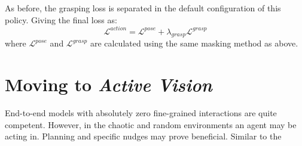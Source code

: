 As before, the grasping loss is separated in the default configuration of this policy. Giving the final loss as: 
\[
  \mathcal{L}^{action} = \mathcal{L}^{pose} + \lambda_{grasp} \mathcal{L}^{grasp}
\]
where $\mathcal{L}^{pose}$ and $\mathcal{L}^{grasp}$ are calculated using the same masking method as above.



\section{Moving to \emph{Active Vision}}
End-to-end models with absolutely zero fine-grained interactions are quite competent. However, in the chaotic and random environments an agent may be acting in. Planning and specific nudges may prove beneficial. Similar to the 



